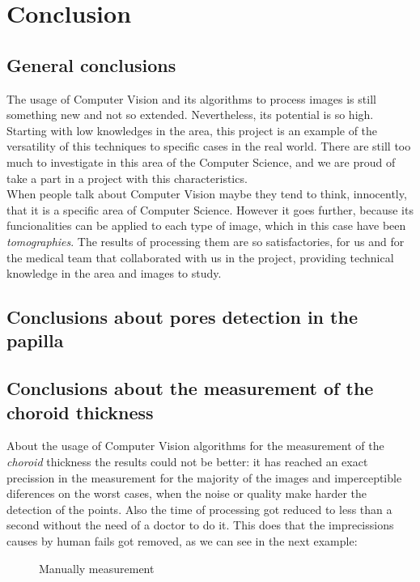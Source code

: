 \chapter{Conclusion}
\section{General conclusions}
The usage of Computer Vision and its algorithms to process images is
still something new and not so extended. Nevertheless, its potential is
so high. Starting with low knowledges in the area, this project is an
example of the versatility of this techniques to specific cases in
the real world. There are still too much to investigate in this area
of the Computer Science, and we are proud of take a part in a project
with this characteristics.\\
When people talk about Computer Vision maybe they tend to think,
innocently, that it is a specific area of Computer Science. However
it goes further, because its funcionalities can be applied to each
type of image, which in this case have been \emph{tomographies}.
The results of processing them are so satisfactories, for us and
for the medical team that collaborated with us in the project, 
providing technical knowledge in the area and images to study.

\section{Conclusions about pores detection in the papilla}

\section{Conclusions about the measurement of the choroid thickness}
About the usage of Computer Vision algorithms for the measurement of
the \emph{choroid} thickness the results could not be better:
it has reached an exact precission in the measurement for the majority
of the images and imperceptible diferences on the worst cases, when
the noise or quality make harder the detection of the points.
Also the time of processing got reduced to less than a second without
the need of a doctor to do it. This does that the imprecissions
causes by human fails got removed, as we can see in the next example:

    \begin{figure}[H]
      \caption{Manually measurement}
      \centering \setlength\fboxsep{0pt} \setlength\fboxrule{0.5pt}
    \end{figure}

